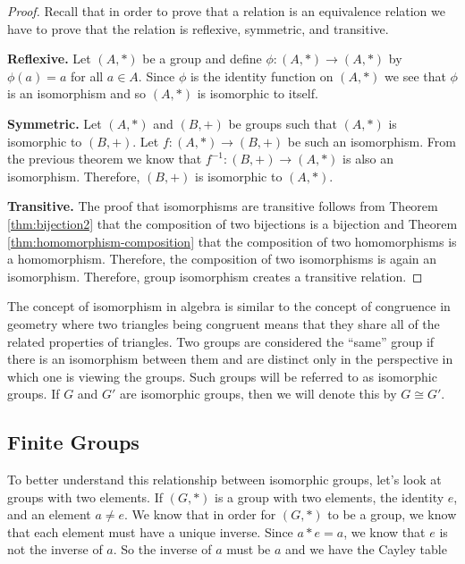 \documentclass[
]{book}
\theoremstyle{definition}
\theoremstyle{definition}
\theoremstyle{definition}
\theoremstyle{remark}
\begin{document}
\begin{proof}
{}Recall that in order to prove that a relation is an equivalence relation we have to prove that the relation is reflexive, symmetric, and transitive.

\textbf{Reflexive.} Let \((A,*)\) be a group and define \(\phi:(A,*)\rightarrow (A,*)\) by \(\phi(a)=a\) for all \(a\in A\). Since \(\phi\) is the identity function on \((A,*)\) we see that \(\phi\) is an isomorphism and so \((A,*)\) is isomorphic to itself.

\textbf{Symmetric.} Let \((A,*)\) and \((B,+)\) be groups such that \((A,*)\) is isomorphic to \((B,+)\). Let \(f:(A,*)\rightarrow (B,+)\) be such an isomorphism. From the previous theorem we know that \(f^{-1}: (B,+) \rightarrow (A,*)\) is also an isomorphism. Therefore, \((B,+)\) is isomorphic to \((A,*)\).

\textbf{Transitive.} The proof that isomorphisms are transitive follows from Theorem \ref{thm:bijection2} that the composition of two bijections is a bijection and Theorem \ref{thm:homomorphism-composition} that the composition of two homomorphisms is a homomorphism. Therefore, the composition of two isomorphisms is again an isomorphism. Therefore, group isomorphism creates a transitive relation.
\end{proof}

The concept of isomorphism in algebra is similar to the concept of congruence in geometry where two triangles being congruent means that they share all of the related properties of triangles. Two groups are considered the ``same'' group if there is an isomorphism between them and are distinct only in the perspective in which one is viewing the groups. Such groups will be referred to as isomorphic groups. If \(G\) and \(G'\) are isomorphic groups, then we will denote this by \(G \cong G'\).

\hypertarget{finite-groups}{%
\subsection{Finite Groups}\label{finite-groups}}

To better understand this relationship between isomorphic groups, let's look at groups with two elements. If \((G,*)\) is a group with two elements, the identity \(e\), and an element \(a\neq e\). We know that in order for \((G,*)\) to be a group, we know that each element must have a unique inverse. Since \(a*e=a\), we know that \(e\) is not the inverse of \(a\). So the inverse of \(a\) must be \(a\) and we have the Cayley table
\end{document}
